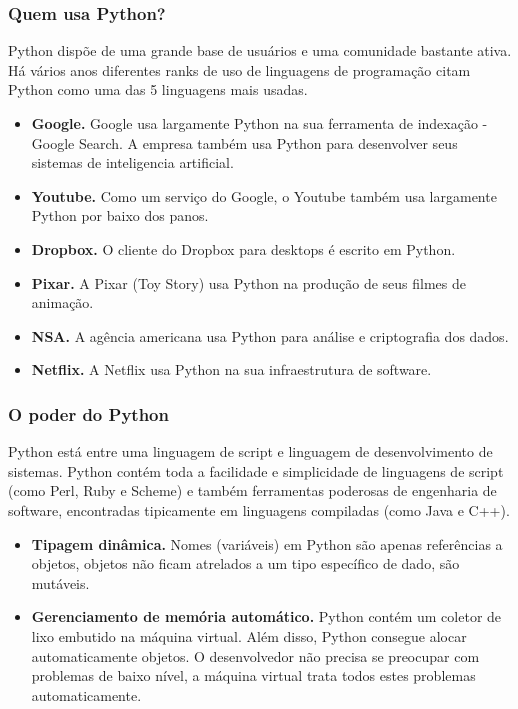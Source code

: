 \documentclass[aspectratio=169]{beamer}
\begin{document}
\begin{frame}
    \frametitle{Quem usa Python?}
    Python dispõe de uma grande base de usuários e uma comunidade bastante ativa. Há vários
anos diferentes ranks de uso de linguagens de programação citam Python como uma das 5
linguagens mais usadas.

    \begin{itemize}
        \item \textbf{Google.} Google usa largamente Python na sua ferramenta de indexação -
 Google Search. A empresa também usa Python para desenvolver seus sistemas de inteligencia
artificial.
        \item \textbf{Youtube.} Como um serviço do Google, o Youtube também usa largamente
Python por baixo dos panos.
        \item \textbf{Dropbox.} O cliente do Dropbox para desktops é escrito em Python.
        \item \textbf{Pixar.} A Pixar (Toy Story) usa Python na produção de seus filmes de
animação.
        \item \textbf{NSA.} A agência americana usa Python para análise e criptografia dos
dados.
        \item \textbf{Netflix.} A Netflix usa Python na sua infraestrutura de software.
    \end{itemize}
\end{frame}

\begin{frame}
    \frametitle{O poder do Python}
    Python está entre uma linguagem de script e linguagem de desenvolvimento de sistemas.
Python contém toda a facilidade e simplicidade de linguagens de script (como Perl, Ruby e
Scheme) e também ferramentas poderosas de engenharia de software, encontradas tipicamente
em linguagens compiladas (como Java e C++).

    \begin{itemize}
        \item \textbf{Tipagem dinâmica.} Nomes (variáveis) em Python são apenas referências
a objetos, objetos não ficam atrelados a um tipo específico de dado, são mutáveis.
        \item \textbf{Gerenciamento de memória automático.} Python contém um coletor de
lixo embutido na máquina virtual. Além disso, Python consegue alocar automaticamente
objetos. O desenvolvedor não precisa se preocupar com problemas de baixo nível, a máquina
virtual trata todos estes problemas automaticamente.
    \end{itemize}
\end{frame}
\end{document}
